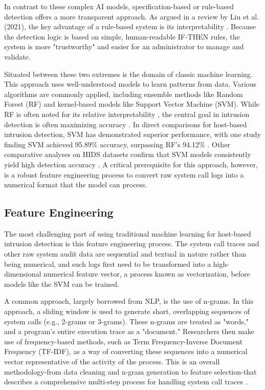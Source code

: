 \documentclass[journal]{./IEEEtran}
\begin{document}
In contrast to these complex AI models, specification-based or rule-based detection offers a more transparent approach. As argued in a review by Liu et al. (2021), the key advantage of a rule-based system is its interpretability \cite{liu2021}. Because the detection logic is based on simple, human-readable IF-THEN rules, the system is more "trustworthy" and easier for an administrator to manage and validate.

Situated between these two extremes is the domain of classic machine learning. This approach uses well-understood models to learn patterns from data. Various algorithms are commonly applied, including ensemble methods like Random Forest (RF) \cite{markovic2022} and kernel-based models like Support Vector Machine (SVM). While RF is often noted for its relative interpretability , the central goal in intrusion detection is often maximizing accuracy \cite{markovic2022}. In direct comparisons for host-based intrusion detection, SVM has demonstrated superior performance, with one study finding SVM achieved 95.89\% accuracy, surpassing RF's 94.12\% \cite{kumar2023}. Other comparative analyses on HIDS datasets confirm that SVM models consistently yield high detection accuracy \cite{shin2020}. A critical prerequisite for this approach, however, is a robust feature engineering process to convert raw system call logs into a numerical format that the model can process.

\subsection{Feature Engineering}
The most challenging part of using traditional machine learning for host-based intrusion detection is this feature engineering process. The system call traces and other raw system audit data are sequential and textual in nature rather than being numerical, and such logs first need to be transformed into a high-dimensional numerical feature vector, a process known as vectorization, before models like the SVM can be trained.

A common approach, largely borrowed from NLP, is the use of n-grams. In this approach, a sliding window is used to generate short, overlapping sequences of system calls (e.g., 2-grams or 3-grams). These n-grams are treated as "words," and a program's entire execution trace as a "document." Researchers then make use of frequency-based methods, such as Term Frequency-Inverse Document Frequency (TF-IDF), as a way of converting these sequences into a numerical vector representative of the activity of the process. This is an overall methodology-from data cleaning and n-gram generation to feature selection-that describes a comprehensive multi-step process for handling system call traces \cite{zhang2020}.
\end{document}
